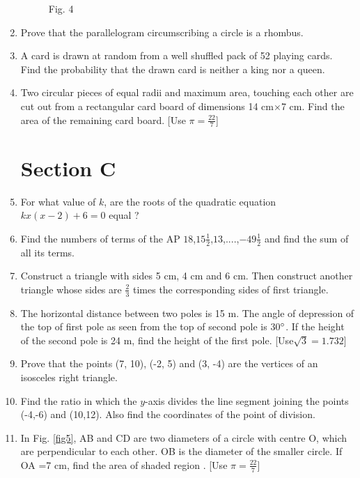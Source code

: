 \documentclass[journal,12pt,twocolumn]{IEEEtran}
\renewcommand\thesection{\arabic{section}}
\begin{document}
\begin{enumerate}[label=\thesection.\arabic*.,ref=\thesection.\theenumi]
\begin{figure}
\caption{Fig. 4}
\label{fig4}
\end{figure}
\item Prove that the parallelogram circumscribing a circle is a rhombus.
\item A card is drawn at random from a well shuffled pack of 52 playing cards. Find the probability that the drawn card is neither a king nor a queen.
\item Two circular pieces of equal radii and maximum area, touching each other are cut out from a rectangular card board of dimensions 14 cm$\times$7 cm. Find the area of the remaining card board. [Use $\pi = \frac{22}{7}$]
\section{Section C}
\item For what value of $k$, are the roots of the quadratic equation $kx (x-2) + 6 = 0$ equal ?
\item Find the numbers of terms of the AP $18$,$15\frac{1}{2}$,$13$,....,$-49\frac{1}{2}$ and find the sum of all its terms.
\item Construct a triangle with sides 5 cm, 4 cm and 6 cm. Then construct another triangle whose sides are $\frac{2}{3}$ times the corresponding sides of first triangle.
\item The horizontal distance between two poles is 15 m. The angle of depression of the top of first pole as seen from the top of second pole is 30$\degree$. If the height of the second pole is 24 m, find the height of the first pole. [Use$\sqrt{3}=1.732$]
\item Prove that the points (7, 10), (-2, 5) and (3, -4) are the vertices of an isosceles right triangle.
\item Find the ratio in which the $y$-axis divides the line segment joining the points (-4,-6) and (10,12). Also find the coordinates of the point of division.
\item In Fig. \ref{fig5}, AB and CD are two diameters of a circle with centre O, which are perpendicular to each other. OB is the diameter of the smaller circle. If OA =7 cm, find the area of shaded region . [Use $\pi = \frac{22}{7}$]\\
	\begin{figure}
		\centering

\end{figure}
\end{enumerate}
\end{document}
